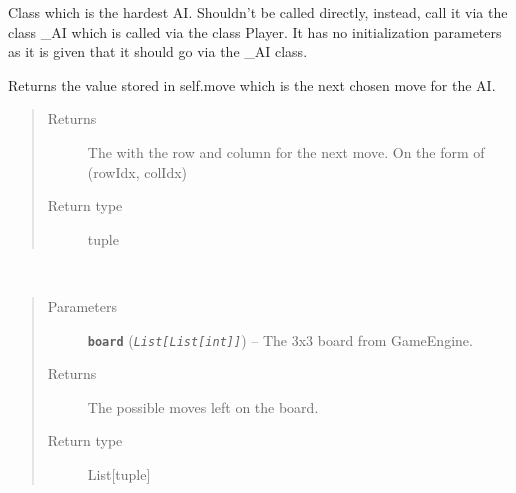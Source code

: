 \documentclass[letterpaper,10pt,english]{sphinxmanual}
\begin{document}
\begin{fulllineitems}
\label{index:AI._AIHard}
Class which is the hardest AI. Shouldn't be called directly, instead, call it via the class \_AI which is
called via the class Player. It has no initialization parameters as it is given that it should go via the \_AI class.

\begin{fulllineitems}
\label{index:AI._AIHard.getMove}
Returns the value stored in self.move which is the next chosen move for the AI.
\begin{quote}\begin{description}
\item[{Returns}] \leavevmode
The with the row and column for the next move. On the form of (rowIdx, colIdx)

\item[{Return type}] \leavevmode
tuple

\end{description}\end{quote}

\end{fulllineitems}


\begin{fulllineitems}
\label{index:AI._AIHard.getPossibleMoves}~\begin{quote}\begin{description}
\item[{Parameters}] \leavevmode
\textbf{\texttt{board}} (\emph{\texttt{List{[}List{[}int{]}{]}}}) -- The 3x3 board from GameEngine.

\item[{Returns}] \leavevmode
The possible moves left on the board.

\item[{Return type}] \leavevmode
List{[}tuple{]}

\end{description}\end{quote}

\end{fulllineitems}



\end{fulllineitems}
\end{document}
